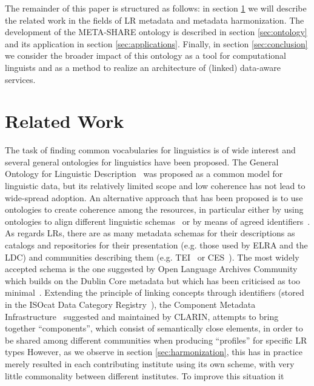 \documentclass{llncs}
\begin{document}
The remainder of this paper is structured as follows: in section
\ref{sec:relatedwork} we will describe the related work in the fields of
LR metadata and metadata harmonization. The development of the
META-SHARE ontology is described in section \ref{sec:ontology}
and its application in section \ref{sec:applications}.
Finally, in section \ref{sec:conclusion} we consider the broader
impact of this ontology as a tool for computational linguists and as a method to
realize an architecture of (linked) data-aware services.
\section{Related Work}
\label{sec:relatedwork}
The task of finding common vocabularies for linguistics is of wide interest and several general ontologies for linguistics have been proposed. The General Ontology for Linguistic Description~\cite[GOLD]{farrar2002common} was proposed as a common model for linguistic data, but its relatively limited scope and low coherence has not lead to wide-spread adoption. An alternative approach that has been proposed is to use ontologies to create coherence among the resources, in particular either by using ontologies to align different linguistic schemas~\cite{chiarcos2012ontologies} or by means of agreed identifiers~\cite{kemps2008isocat}. 
As regards LRs, there are as many metadata schemas for their descriptions as
catalogs and repositories for their presentation (e.g. those used by ELRA and
the LDC) and communities describing them (e.g. TEI~\cite{ide1995text} or
CES~\cite{ide1998corpus}). The most widely accepted schema is the one  suggested
by Open Language Archives Community~\cite[OLAC]{bird2001olac} which builds on
the Dublin Core metadata but which has been criticised as too minimal~\cite{who}. 
Extending the principle of linking concepts through identifiers (stored in the
ISOcat Data Category Registry~\cite{kemps2008isocat}), the Component Metadata Infrastructure~\cite{broeder2012cmdi} suggested and maintained by CLARIN, attempts to bring together ``components'', which consist of semantically close elements, in order to be shared among different communities when producing ``profiles'' for specific LR types
However, as  we observe in section \ref{sec:harmonization}, this has in practice
merely resulted in each contributing institute using its own scheme, with very
little commonality between different institutes. To improve this situation it
\end{document}
